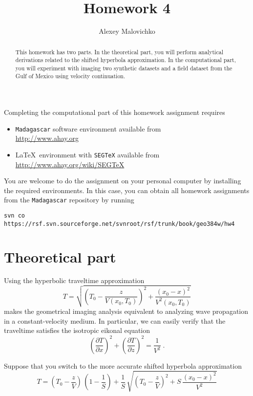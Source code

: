 \author{Alexey Malovichko} 
\title{Homework 4}

\begin{abstract}
  This homework has two parts. In the theoretical part, you will
  perform analytical derivations related to the shifted hyperbola
  approximation. In the computational part, you will experiment with
  imaging two synthetic datasets and a field dataset from the Gulf of
  Mexico using velocity continuation.
\end{abstract}

Completing the computational part of this homework assignment requires
\begin{itemize}
\item \texttt{Madagascar} software environment available from \\
  \url{http://www.ahay.org}
\item \LaTeX\ environment with \texttt{SEGTeX} available from \\ 
  \url{http://www.ahay.org/wiki/SEGTeX}
\end{itemize}

You are welcome to do the assignment on your personal computer by
installing the required environments. In this case, you can obtain all
homework assignments from the \texttt{Madagascar} repository by running
\begin{verbatim}
svn co https://rsf.svn.sourceforge.net/svnroot/rsf/trunk/book/geo384w/hw4 
\end{verbatim}

\section{Theoretical part}

Using the hyperbolic traveltime approximation
\begin{equation}
T = \sqrt{\left(T_0-\frac{z}{V(x_0,T_0)}\right)^2 + \frac{(x_0-x)^2}{V^2(x_0,T_0)}}
\end{equation}
makes the geometrical imaging analysis equivalent to analyzing wave
propagation in a constant-velocity medium. In particular, we can easily
verify that the traveltime satisfies the isotropic eikonal equation 
\begin{equation}
\left(\frac{\partial T}{\partial x}\right)^2 + \left(\frac{\partial T}{\partial z}\right)^2 = \frac{1}{V^2}\;.
\end{equation}

Suppose that you switch to the more accurate shifted hyperbola approximation
\begin{equation}
T = \left(T_0-\frac{z}{V}\right)\,(1-\frac{1}{S}) + \frac{1}{S}\,\sqrt{\left(T_0-\frac{z}{V}\right)^2 + S\,\frac{(x_0-x)^2}{V^2}}
\end{equation}

